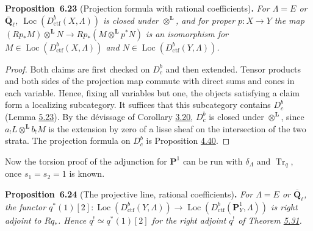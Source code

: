 \documentclass[11pt]{article}
\newenvironment{bpstatement}[2]{\par\addvspace{0.6\baselineskip}\noindent\textbf{#1}#2\textbf{.}\enspace\ignorespaces}
  {\par\addvspace{0.4\baselineskip}}
\newenvironment{bpstatementit}[2]{\begin{bpstatement}{#1}{#2}\itshape\ignorespaces}{\end{bpstatement}}
\providecommand{\Dbc}{}\renewcommand{\Dbc}{D^b_c}
\providecommand{\Loc}{}\renewcommand{\Loc}{\operatorname{Loc}}
\begin{document}
\label{bp584}%
\begin{bpstatementit}{Proposition~6.23}{ (Projection formula with rational coefficients)}
For \(\Lambda=E\) or \(\overline{\mathbf Q}_\ell\), \(\Loc(D^b_{\mathrm{ctf}}(X,\Lambda))\) is closed under \(\otimes^{\mathbf L}\), and for proper \(p:X\to Y\) the map \((Rp_*M)\otimes^{\mathbf L}N\to Rp_*(M\otimes^{\mathbf L}p^*N)\) is an isomorphism for \(M\in\Loc(D^b_{\mathrm{ctf}}(X,\Lambda))\) and \(N\in\Loc(D^b_{\mathrm{ctf}}(Y,\Lambda))\).
\end{bpstatementit}

\begin{proof}[{Proof}]\label{bp585}%
Both claims are first checked on \(\Dbc\) and then extended. Tensor products and both sides of the projection map commute with direct sums and cones in each variable. Hence, fixing all variables but one, the objects satisfying a claim form a localizing subcategory. It suffices that this subcategory contains \(\Dbc\) (Lemma \hyperref[bp485]{5.23}). By the dévissage of Corollary \hyperref[bp253]{3.20}, \(\Dbc\) is closed under \(\otimes^{\mathbf L}\), since \(a_!L\otimes^{\mathbf L}b_!M\) is the extension by zero of a lisse sheaf on the intersection of the two strata. The projection formula on \(\Dbc\) is Proposition \hyperref[bp405]{4.40}.
\end{proof}

\label{bp586}%
Now the torsion proof of the adjunction for \(\mathbf P^1\) can be run with \(\delta_\Lambda\) and \(\operatorname{Tr}_q\), once \(s_1=s_2=1\) is known.

\label{bp587}%
\begin{bpstatementit}{Proposition~6.24}{ (The projective line, rational coefficients)}
For \(\Lambda=E\) or \(\overline{\mathbf Q}_\ell\), the functor \(q^*(1)[2]:\Loc(D^b_{\mathrm{ctf}}(Y,\Lambda))\to\Loc(D^b_{\mathrm{ctf}}(\mathbf P^1_Y,\Lambda))\) is right adjoint to \(Rq_*\). Hence \(q^!\simeq q^*(1)[2]\) for the right adjoint \(q^!\) of Theorem \hyperref[bp506]{5.31}.
\end{bpstatementit}
\end{document}
